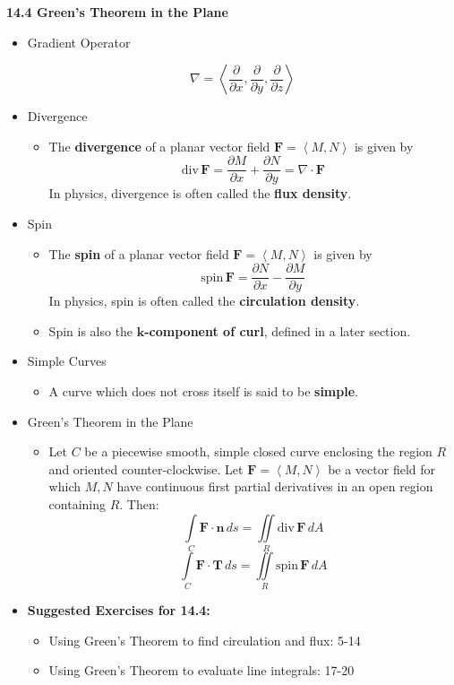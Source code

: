 \documentclass[12pt]{article}
\renewcommand{\vec}[1]{\mathbf{#1}}
\newcommand{\veck}{\mathbf{k}}
\newcommand{\dvar}[1]{\,d{#1}}
\renewcommand{\div}{\textrm{div}\,}
\newcommand{\spin}{\textrm{spin}\,}
\newcommand{\<}{\left<}
\renewcommand{\>}{\right>}
\begin{document}
  \newpage
  
  \centerline{\bf 14.4 Green's Theorem in the Plane}
  
  \begin{itemize}
    
  \item Gradient Operator

  \[\nabla = \<\frac{\partial}{\partial x},\frac{\partial}{\partial y},\frac{\partial}{\partial z}\>\]
    
  \item Divergence
  
    \begin{itemize}
    \item The \textbf{divergence} of a planar vector field $\vec{F}=\<M,N\>$ is given by \[ \div \vec{F} = \frac{\partial M}{\partial x}+\frac{\partial N}{\partial y} = \nabla\cdot\vec{F} \]
    In physics, divergence is often called the \textbf{flux density}.
    \end{itemize}
  
  \item Spin
  
    \begin{itemize}
    \item The \textbf{spin} of a planar vector field $\vec{F}=\<M,N\>$ is given by \[ \spin \vec{F} = \frac{\partial N}{\partial x}-\frac{\partial M}{\partial y} \]
    In physics, spin is often called the \textbf{circulation density}.
    \item Spin is also the \textbf{$\veck$-component of curl}, defined in a later section.
    \end{itemize}
    
  \item Simple Curves
    \begin{itemize}
    \item A curve which does not cross itself is said to be \textbf{simple}.
    \end{itemize}

  \item Green's Theorem in the Plane
    \begin{itemize}
    \item Let $C$ be a piecewise smooth, simple closed curve enclosing the region $R$ and oriented counter-clockwise. Let $\vec{F}=\<M,N\>$ be a vector field for which $M,N$ have continuous first partial derivatives in an open region containing $R$. Then:
      \[\int\limits_C \vec{F}\cdot\vec{n}\,ds = \iint\limits_R \div \vec{F}\dvar{A}\]
      \[\int\limits_C \vec{F}\cdot\vec{T}\dvar{s} = \iint\limits_R \spin \vec{F}\dvar{A}\]
    \end{itemize}
    
  \item \textbf{Suggested Exercises for 14.4:}
  
    \begin{itemize}
    \item Using Green's Theorem to find circulation and flux: 5-14
    \item Using Green's Theorem to evaluate line integrals: 17-20
    \end{itemize}
    
  \end{itemize}
  
\end{document}
